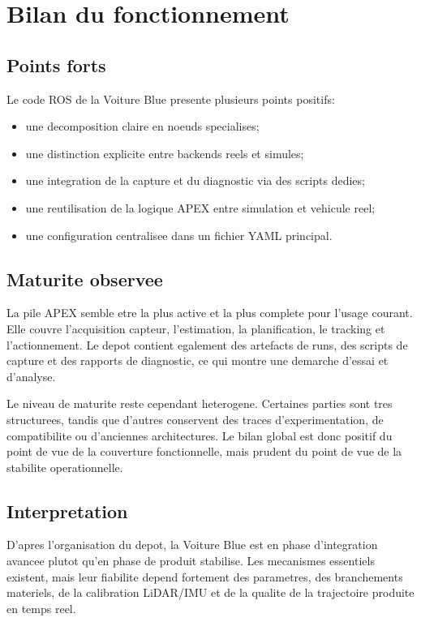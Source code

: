 \section{Bilan du fonctionnement}

\subsection{Points forts}

Le code ROS de la Voiture Blue presente plusieurs points positifs:

\begin{itemize}
  \item une decomposition claire en noeuds specialises;
  \item une distinction explicite entre backends reels et simules;
  \item une integration de la capture et du diagnostic via des scripts dedies;
  \item une reutilisation de la logique APEX entre simulation et vehicule reel;
  \item une configuration centralisee dans un fichier YAML principal.
\end{itemize}

\subsection{Maturite observee}

La pile APEX semble etre la plus active et la plus complete pour l'usage courant. Elle couvre l'acquisition capteur, l'estimation, la planification, le tracking et l'actionnement. Le depot contient egalement des artefacts de runs, des scripts de capture et des rapports de diagnostic, ce qui montre une demarche d'essai et d'analyse.

Le niveau de maturite reste cependant heterogene. Certaines parties sont tres structurees, tandis que d'autres conservent des traces d'experimentation, de compatibilite ou d'anciennes architectures. Le bilan global est donc positif du point de vue de la couverture fonctionnelle, mais prudent du point de vue de la stabilite operationnelle.

\subsection{Interpretation}

D'apres l'organisation du depot, la Voiture Blue est en phase d'integration avancee plutot qu'en phase de produit stabilise. Les mecanismes essentiels existent, mais leur fiabilite depend fortement des parametres, des branchements materiels, de la calibration LiDAR/IMU et de la qualite de la trajectoire produite en temps reel.

